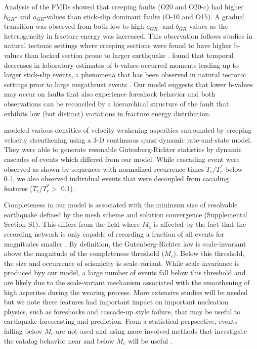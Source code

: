 \documentclass[preprint,1p, 10pt,authoryear]{elsarticle}
\begin{document}
Analysis of the FMDs showed that creeping faults (O20 and O20-c) had higher $b_{GR}$- and $a_{GR}$-values than stick-slip dominant faults (O-10 and O15). A gradual transition was observed from both low to high $a_{GR}$- and $b_{GR}$-values as the heterogeneity in fracture energy was increased. This observation follows studies in natural tectonic settings where creeping sections were found to have higher b-values than locked section prone to larger earthquake \citep{Amelung1997, Tormann2014}. \citet{Goebel2013} found that temporal decreases in laboratory estimates of b-values occurred moments leading up to larger stick-slip events, a phenomena that has been observed in natural tectonic settings prior to large megathrust events \citep{Tormann2015,Gulia2016,Gulia2019}. Our model suggests that lower b-values may occur on faults that also experience foreshock behavior and both observations can be reconciled by a hierarchical structure of the fault that exhibits low (but distinct) variations in fracture energy distribution.

\citet{Dublachet2013} modeled various densities of velocity weakening asperities surrounded by creeping velocity strenthening using a 3-D continuous quasi-dynamic rate-and-state model. They were able to generate resonable Gutenberg-Richter statistics by dynamic cascades of events which differed from our model. While cascading event were observed as shown by sequences with normalized recurrence times $T_{r}/T^{*}_{r}$ below 0.1, we also observed individual events that were decoupled from cacading features ($T_{r}/T^{*}_{r} >$ 0.1). 

Completeness in our model is associated with the minimum size of resolvable earthquake defined by the mesh scheme and solution convergence (Supplemental Section S1). This differs from the field where $M_{c}$ is affected by the fact that the recording network is only capable of recording a fraction of all events for magnitudes smaller \citep{Wiemer2002}. By definition, the Gutenberg-Richter law is scale-invariant above the magnitude of the completeness threshold ($M_{c}$). Below this threshold, the size and occurrence of seismicity is scale-variant. While scale-invariance is produced byy our model, a large number of events fall below this threshold and are likely due to the scale-variant mechanism associated with the smoothening of high asperites during the wearing process. More extensive studies will be needed but we note these features had important impact on important nucleation physics, such as foreshocks and cascade-up style failure, that may be useful to earthquake forescasting and prediction. From a statistical perpsective, events falling below $M_{c}$ are not used and using more involved methods that investigate the catalog behavior near and below $M_{c}$ will be useful \citep{Mignan2012, Mignan2020}.
\end{document}
